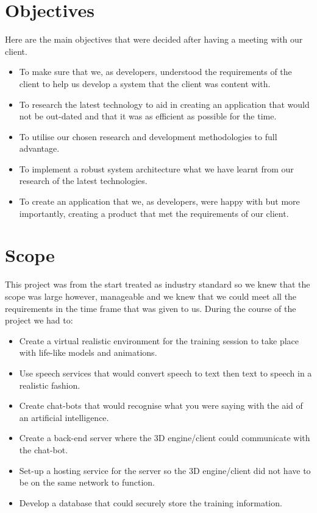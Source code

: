 \section{Objectives}
Here are the main objectives that were decided after having a meeting with our client.

\begin{itemize}
    \item To make sure that we, as developers, understood the requirements of the client to help us develop a system that the client was content with. 
    
    \item To research the latest technology to aid in creating an application that would not be out-dated and that it was as efficient as possible for the time.
    
    \item To utilise our chosen research and development methodologies to full advantage.
    
    \item To implement a robust system architecture what we have learnt from our research of the latest technologies. 
    
    \item To create an application that we, as developers, were happy with but more importantly, creating a product that met the requirements of our client.
    
\end{itemize}

\section{Scope}
This project was from the start treated as industry standard so we knew that the scope was large however, manageable and we knew that we could meet all the requirements in the time frame that was given to us. During the course of the project we had to:
\begin{itemize}
    \item Create a virtual realistic environment for the training session to take place with life-like models and animations.
    
    \item Use speech services that would convert speech to text then text to speech in a realistic fashion.
    
    \item Create chat-bots that would recognise what you were saying with the aid of an artificial intelligence.
    
    \item Create a back-end server where the 3D engine/client could communicate with the chat-bot.
    
    \item Set-up a hosting service for the server so the 3D engine/client did not have to be on the same network to function.
    
    \item Develop a database that could securely store the training information.
    
\end{itemize}

